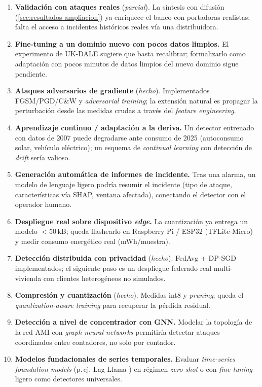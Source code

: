 \begin{enumerate}[label=\textbf{LF\arabic*.},leftmargin=*,topsep=2pt]
  \item[\textbf{LF1.}] \textbf{Validación con ataques reales} (\emph{parcial}). La síntesis con difusión (\cref{sec:resultados-ampliacion}) ya enriquece el banco con portadoras realistas; falta el acceso a incidentes históricos reales vía una distribuidora.
  \item[\textbf{LF2.}] \textbf{Fine-tuning a un dominio nuevo con pocos datos limpios.} El experimento de UK-DALE sugiere que basta recalibrar; formalizarlo como adaptación con pocos minutos de datos limpios del nuevo dominio sigue pendiente.
  \item[\textbf{LF3.}] \textbf{Ataques adversarios de gradiente} (\emph{hecho}). Implementados FGSM/PGD/C\&W y \emph{adversarial training}; la extensión natural es propagar la perturbación desde las medidas crudas a través del \emph{feature engineering}.
  \item[\textbf{LF4.}] \textbf{Aprendizaje continuo / adaptación a la deriva.} Un detector entrenado con datos de 2007 puede degradarse ante consumo de 2025 (autoconsumo solar, vehículo eléctrico); un esquema de \emph{continual learning} con detección de \textit{drift} sería valioso.
  \item[\textbf{LF5.}] \textbf{Generación automática de informes de incidente.} Tras una alarma, un modelo de lenguaje ligero podría resumir el incidente (tipo de ataque, características vía SHAP, ventana afectada), conectando el detector con el operador humano.
  \item[\textbf{LF6.}] \textbf{Despliegue real sobre dispositivo \emph{edge}.} La cuantización ya entrega un modelo $<$50\,kB; queda flashearlo en Raspberry Pi / ESP32 (TFLite-Micro) y medir consumo energético real (mWh/muestra).
  \item[\textbf{LF7.}] \textbf{Detección distribuida con privacidad} (\emph{hecho}). FedAvg + DP-SGD implementados; el siguiente paso es un despliegue federado real multi-vivienda con clientes heterogéneos no simulados.
  \item[\textbf{LF8.}] \textbf{Compresión y cuantización} (\emph{hecho}). Medidas int8 y \emph{pruning}; queda el \emph{quantization-aware training} para recuperar la pérdida residual.
  \item[\textbf{LF9.}] \textbf{Detección a nivel de concentrador con GNN.} Modelar la topología de la red AMI con \emph{graph neural networks} permitiría detectar ataques coordinados entre contadores, no solo por contador.
  \item[\textbf{LF10.}] \textbf{Modelos fundacionales de series temporales.} Evaluar \emph{time-series foundation models} (p.\,ej. Lag-Llama \cite{rasul2024lagllama}) en régimen \emph{zero-shot} o con \emph{fine-tuning} ligero como detectores universales.
\end{enumerate}


